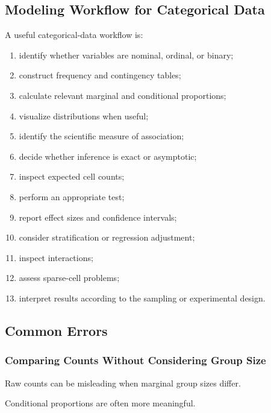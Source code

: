 \subsection{Modeling Workflow for Categorical Data}
\label{subsec:categorical-modeling-workflow}

A useful categorical-data workflow is:

\begin{enumerate}
    \item identify whether variables are nominal, ordinal, or binary;
    \item construct frequency and contingency tables;
    \item calculate relevant marginal and conditional proportions;
    \item visualize distributions when useful;
    \item identify the scientific measure of association;
    \item decide whether inference is exact or asymptotic;
    \item inspect expected cell counts;
    \item perform an appropriate test;
    \item report effect sizes and confidence intervals;
    \item consider stratification or regression adjustment;
    \item inspect interactions;
    \item assess sparse-cell problems;
    \item interpret results according to the sampling or experimental
          design.
\end{enumerate}

\subsection{Common Errors}
\label{subsec:categorical-common-errors}

\subsubsection{Comparing Counts Without Considering Group Size}

Raw counts can be misleading when marginal group sizes differ.

Conditional proportions are often more meaningful.

